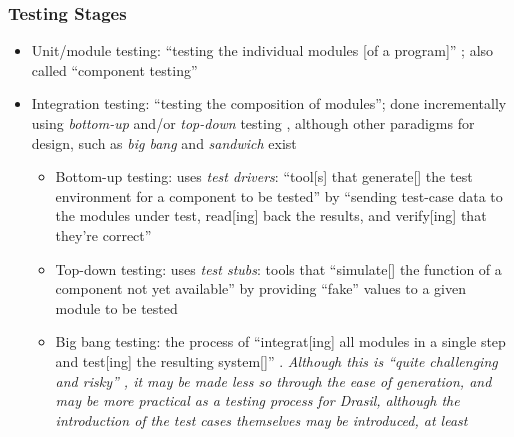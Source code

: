 \subsubsection{Testing Stages}
\begin{itemize}
      \item Unit/module testing: ``testing the individual modules [of a
                        program]'' \cite[p.~438]{van_vliet_software_2000};
            also called ``component testing'' \cite[p.~444]{peters_software_2000}
      \item Integration testing: ``testing the composition of modules'';
            done incrementally using \emph{bottom-up} and/or
            \emph{top-down} testing \cite[pp.~438-439]{van_vliet_software_2000},
            although other paradigms for design, such as \emph{big bang} and
            \emph{sandwich} exist \cite[p.~489]{peters_software_2000}
            \begin{itemize}
                  \item Bottom-up testing: uses \emph{test drivers}: ``tool[s]
                        that generate[] the test environment for a component to
                        be tested'' \cite[p.~410]{van_vliet_software_2000} by
                        ``sending test-case data to the modules under test,
                        read[ing] back the results, and verify[ing] that
                        they're correct'' \cite[p.~109]{patton_software_2006}
                  \item Top-down testing: uses \emph{test stubs}: tools that
                        ``simulate[] the function of a component not yet
                        available'' \cite[p.~410]{van_vliet_software_2000} by
                        providing ``fake'' values to a given module to be
                        tested \cite[p.~110]{patton_software_2006}
                  \item Big bang testing: the process of ``integrat[ing] all
                        modules in a single step and test[ing] the resulting
                        system[]'' \cite[p.~489]{peters_software_2000}.
                        \emph{Although this is ``quite challenging and risky''
                              \cite[p.~489]{peters_software_2000}, it may be
                              made less so through the ease of generation,
                              and may be more practical as a testing process
                              for Drasil, although the introduction of the
                              test cases themselves may be introduced, at least
}
\end{itemize}
\end{itemize}
